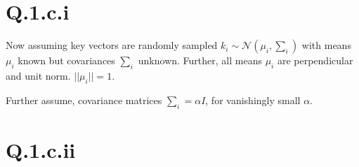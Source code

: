 \documentclass[11pt]{article}
\begin{document}
\section*{Q.1.c.i}
\label{sec:org5c0b914}

Now assuming key vectors are randomly sampled \(k_{i} \sim \mathcal{N}(\mu_{i}, \sum_{i})\) with means \(\mu_{i}\) known but covariances \(\sum_{i}\) unknown. Further, all means \(\mu_{i}\) are perpendicular and unit norm. \(||\mu_{i}|| = 1\).

Further assume, covariance matrices \(\sum_{i} = \alpha I\), for vanishingly small \(\alpha\).

\section*{Q.1.c.ii}
\label{sec:orgf06edcc}
\end{document}
